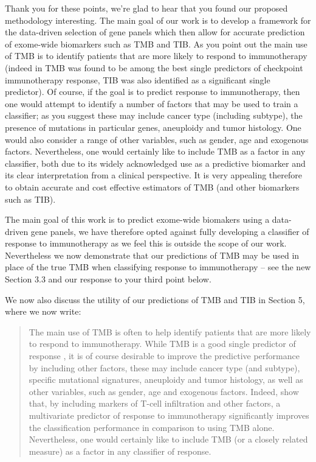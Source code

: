 \documentclass[12pt]{article}
\begin{document}
Thank you for these points, we're glad to hear that you found our proposed methodology interesting.  The main goal of our work is to develop a framework for the data-driven selection of gene panels which then allow for accurate prediction of exome-wide biomarkers such as TMB and TIB.  As you point out the main use of TMB is to identify patients that are more likely to respond to immunotherapy (indeed in \citet{litchfield2021meta} TMB was found to be among the best single predictors of checkpoint immunotherapy response, TIB was also identified as a significant single predictor).  Of course, if the goal is to predict response to immunotherapy, then one would attempt to identify a number of factors that may be used to train a classifier; as you suggest these may include cancer type (including subtype),  the presence of mutations in particular genes, aneuploidy and tumor histology. One would also consider a range of other variables, such as gender, age and exogenous factors. Nevertheless, one would certainly like to include TMB as a factor in any classifier, both due to its widely acknowledged use as a predictive biomarker and its clear interpretation from a clinical perspective.  It is very appealing therefore to obtain accurate and cost effective estimators of TMB (and other biomarkers such as TIB).  

The main goal of this work is to predict exome-wide biomakers using a data-driven gene panels, we have therefore opted against fully developing a classifier of response to immunotherapy as we feel this is outside the scope of our work.  Nevertheless we now demonstrate that our predictions of TMB may be used in place of the true TMB when classifying response to immunotherapy -- see the new Section 3.3 and our response to your third point below. 

We now also discuss the utility of our predictions of TMB and TIB in Section 5, where we now write:
\begin{quotation}
The main use of TMB is often to help identify patients that are more likely to respond to immunotherapy. While TMB is a good single predictor of response \citep{cao_high_2019, zhu_association_2019}, it is of course desirable to improve the predictive performance by including other factors, these may include  cancer type (and subtype), specific mutational signatures, aneuploidy and tumor histology, as well as other variables, such as gender, age and exogenous factors. Indeed, \citet{litchfield2021meta} show that, by including markers of T-cell infiltration and other factors, a multivariate predictor of response to immunotherapy significantly improves the classification performance in comparison to using TMB alone.  Nevertheless, one would certainly like to include TMB (or a closely related measure) as a factor in any classifier of response.
\end{quotation}
\end{document}
